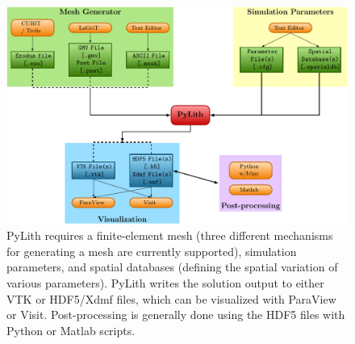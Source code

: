 \begin{figure}[htbp]
  \includegraphics[width=5in]{runpylith/figs/runpylith} 
  \caption{PyLith requires a finite-element mesh (three different
    mechanisms for generating a mesh are currently supported),
    simulation parameters, and spatial databases (defining the spatial
    variation of various parameters).  PyLith writes the solution
    output to either VTK or HDF5/Xdmf files, which can be visualized
    with ParaView or Visit. Post-processing is generally done using
    the HDF5 files with Python or Matlab scripts.}
\label{fig:pylith:workflow} 
\end{figure}










